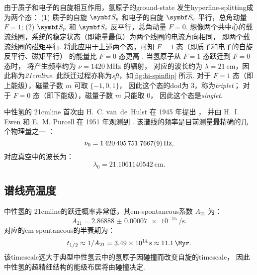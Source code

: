 由于质子和电子的自旋相互作用，氢原子的\ac{ground-state}
发生\ac{hyperfine-splitting}成为两个态：
(1) 质子的自旋 $\B{S}_p$ 和电子的自旋 $\B{S}_e$ 平行，总角动量 $F = 1$;
(2) $\B{S}_p$ 和 $\B{S}_e$ 反平行，总角动量 $F = 0$.
想像两个共中心的载流线圈，系统的稳定状态（即能量最低）为两个线圈的电流方向相同，
即两个载流线圈的磁矩平行.
将此应用于上述两个态，可知 $F = 1$ 态（即质子和电子的自旋反平行、磁矩平行）
的能量比 $F = 0$ 态更高 \cite{griffiths1982}.
当氢原子从 $F = 1$ 态跃迁到 $F = 0$ 态时，
将产生频率约为 $\nu = \SI{1420}{\MHz}$ 的辐射，
对应的波长约为 $\lambda = \SI{21}{\cm}$，因此称为\emph{\acf{21cmline}}.
此跃迁过程亦称为\emph{\acf{sft}}，如\autoref{fig:hi-spinflip} 所示.
对于 $F = 1$ 态（即上能级），磁量子数 $m$ 可取 $\{ -1, 0, 1 \}$，
因此这个态的\ac{dod}为 3，称为\emph{\acf{triplet}}；
对于 $F = 0$ 态（即下能级），磁量子数 $m$ 只能取 0，
因此这个态是\emph{\acf{singlet}}.

中性氢的 \ac{21cmline}%
首次由 H.~C. van~de~Hulst 在 1945 年提出 \cite{vanDeHulst1945}，
并由 H.~I. Ewen 和 E.~M. Purcell 在 1951 年观测到 \cite{ewen1951}.
该谱线的频率是目前测量最精确的几个物理量之一 \cite{hellwig1970,essen1971}：
\begin{equation}
  \label{eq:hi-line-frequency}
  \nu_0 = \SI{1420405751.7667 +- 0.0009}{\Hz} ,
\end{equation}
对应真空中的波长为：
\begin{equation}
  \label{eq:hi-line-wavelength}
  \lambda_0 = \SI{21.1061140542}{\cm} .
\end{equation}

\subsection{谱线亮温度}

中性氢的 \ac{21cmline}的跃迁概率非常低，其\ac{em-spontaneous}系数 $A_{21}$ 为：
\begin{equation}
  A_{21} = \SI[separate-uncertainty=false]{2.86888(7)e-15}{\per\second} .
\end{equation}
对应的\ac{em-spontaneous}的半衰期为：
\begin{equation}
  t_{1/2} \approx 1 / A_{21}
    = \SI{3.49e14}{\second} \approx \SI{11.1}{\Myr} .
\end{equation}
该\ac{timescale}远大于典型中性氢云中的氢原子因碰撞而改变自旋的\ac{timescale}，
因此中性氢的超精细结构的能级布居将由碰撞决定.


